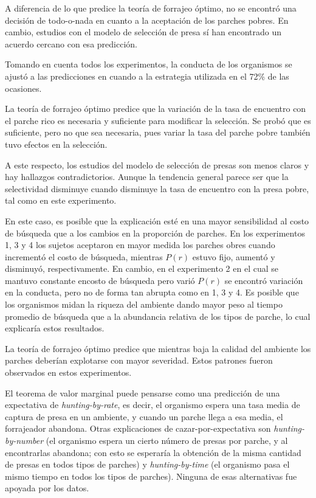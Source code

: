 \documentclass[a4paper,12pt]{article}
\begin{document}
A diferencia de lo que predice la teoría de forrajeo óptimo, no se encontró una decisión de todo-o-nada en cuanto a la aceptación de los parches pobres. En cambio, estudios con el modelo de selección de presa sí han encontrado un acuerdo cercano con esa predicción.

Tomando en cuenta todos los experimentos, la conducta de los organismos se ajustó a las predicciones en cuando a la estrategia utilizada en el 72\% de las ocasiones.

La teoría de forrajeo óptimo predice que la variación de la tasa de encuentro con el parche rico es necesaria y suficiente para modificar la selección. Se probó que es suficiente, pero no que sea necesaria, pues variar la tasa del parche pobre también tuvo efectos en la selección.

A este respecto, los estudios del modelo de selección de presas son menos claros y hay hallazgos contradictorios. Aunque la tendencia general parece ser que la selectividad disminuye cuando disminuye la tasa de encuentro con la presa pobre, tal como en este experimento.

En este caso, es posible que la explicación esté en una mayor sensibilidad al costo de búsqueda que a los cambios en la proporción de parches. En los experimentos 1, 3 y 4 los sujetos aceptaron en mayor medida los parches obres cuando incrementó el costo de búsqueda, mientras $P(r)$ estuvo fijo, aumentó y disminuyó, respectivamente. En cambio, en el experimento 2 en el cual se mantuvo constante encosto de búsqueda pero varió $P(r)$ se encontró variación en la conducta, pero no de forma tan abrupta como en 1, 3 y 4. Es posible que los organismos midan la riqueza del ambiente dando mayor peso al tiempo promedio de búsqueda que a la abundancia relativa de los tipos de parche, lo cual explicaría estos resultados.

La teoría de forrajeo óptimo predice que mientras baja la calidad del ambiente los parches deberían explotarse con mayor severidad. Estos patrones fueron observados en estos experimentos.

El teorema de valor marginal puede pensarse como una predicción de una expectativa de {\itshape hunting-by-rate}, es decir, el organismo espera una tasa media de captura de presa en un ambiente, y cuando un parche llega a esa media, el forrajeador abandona.
Otras explicaciones de cazar-por-expectativa son {\itshape hunting-by-number} (el organismo espera un cierto número de presas por parche, y al encontrarlas abandona; con esto se esperaría la obtención de la misma cantidad de presas en todos tipos de parches) y {\itshape hunting-by-time} (el organismo pasa el mismo tiempo en todos los tipos de parches). Ninguna de esas alternativas fue apoyada por los datos.
\end{document}
